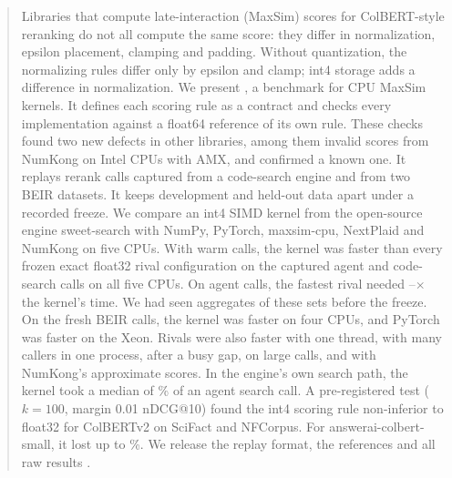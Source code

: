 \begin{abstract}
\noindent
Libraries that compute late-interaction (MaxSim) scores for ColBERT-style reranking do not all compute the same score: they differ in normalization, epsilon placement, clamping and padding.
Without quantization, the normalizing rules differ only by epsilon and clamp; int4 storage adds a difference in normalization.
We present \benchname, a benchmark for CPU MaxSim kernels.
It defines each scoring rule as a contract and checks every implementation against a float64 reference of its own rule.
These checks found two new defects in other libraries, among them invalid scores from NumKong on Intel CPUs with AMX, and confirmed a known one.
It replays rerank calls captured from a code-search engine and from two BEIR datasets.
It keeps development and held-out data apart under a recorded freeze.
We compare an int4 SIMD kernel from the open-source engine sweet-search with NumPy, PyTorch, maxsim-cpu, NextPlaid and NumKong on five CPUs.
With warm calls, the kernel was faster than every frozen exact float32 rival configuration on the captured agent and code-search calls on all five CPUs.
On agent calls, the fastest rival needed --$\times$ the kernel's time.
We had seen aggregates of these sets before the freeze.
On the fresh BEIR calls, the kernel was faster on four CPUs, and PyTorch was faster on the Xeon.
Rivals were also faster with one thread, with many callers in one process, after a busy gap, on large calls, and with NumKong's approximate scores.
In the engine's own search path, the kernel took a median of \% of an agent search call.
A pre-registered test ($k = 100$, margin 0.01 nDCG@10) found the int4 scoring rule non-inferior to float32 for ColBERTv2 on SciFact and NFCorpus.
For answerai-colbert-small, it lost up to \%.
We release the replay format, the references and all raw results .
\end{abstract}
